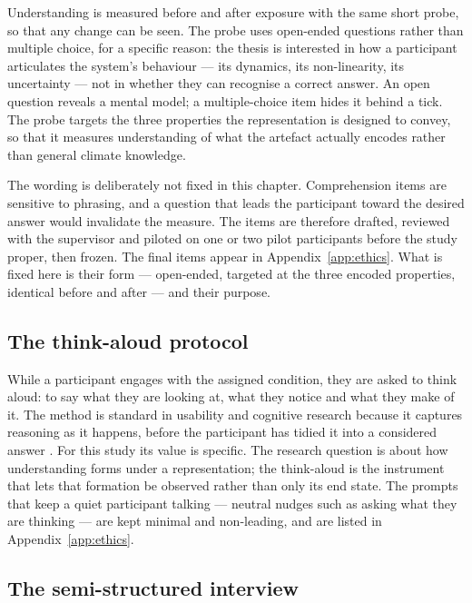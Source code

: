 Understanding is measured before and after exposure with the same short probe, so that any change can be seen. The probe uses open-ended questions rather than multiple choice, for a specific reason: the thesis is interested in how a participant articulates the system's behaviour --- its dynamics, its non-linearity, its uncertainty --- not in whether they can recognise a correct answer. An open question reveals a mental model; a multiple-choice item hides it behind a tick. The probe targets the three properties the representation is designed to convey, so that it measures understanding of what the artefact actually encodes rather than general climate knowledge.
 
The wording is deliberately not fixed in this chapter. Comprehension items are sensitive to phrasing, and a question that leads the participant toward the desired answer would invalidate the measure. The items are therefore drafted, reviewed with the supervisor and piloted on one or two pilot participants before the study proper, then frozen. The final items appear in Appendix~\ref{app:ethics}. What is fixed here is their form --- open-ended, targeted at the three encoded properties, identical before and after --- and their purpose.
 
\subsection{The think-aloud protocol}
\label{subsec:instr-thinkaloud}
 
While a participant engages with the assigned condition, they are asked to think aloud: to say what they are looking at, what they notice and what they make of it. The method is standard in usability and cognitive research because it captures reasoning as it happens, before the participant has tidied it into a considered answer \citep{ericsson1993}. For this study its value is specific. The research question is about how understanding forms under a representation; the think-aloud is the instrument that lets that formation be observed rather than only its end state. The prompts that keep a quiet participant talking --- neutral nudges such as asking what they are thinking --- are kept minimal and non-leading, and are listed in Appendix~\ref{app:ethics}.
 
\subsection{The semi-structured interview}
\label{subsec:instr-interview}
 
